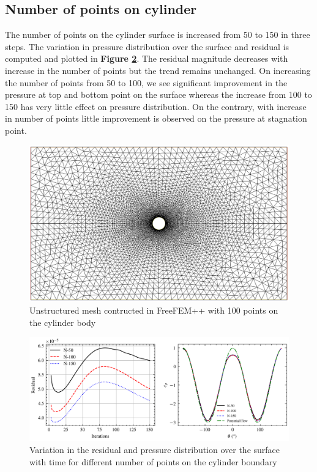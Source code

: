 \documentclass{article}
\begin{document}
\subsection{Number of points on cylinder}
The number of points on the cylinder surface is increased from 50 to 150 in three steps. The variation in
pressure distribution over the surface and residual is computed and plotted in \textbf{Figure \ref{fig:n}}.
The residual magnitude decreases with increase in the number of points but the trend remains unchanged. On
increasing the number of points from 50 to 100, we see significant improvement in the pressure at top and
bottom point on the surface whereas the increase from 100 to 150 has very little effect on pressure distribution.
On the contrary, with increase in number of points little improvement is observed on the pressure at stagnation
point.
\begin{figure}[H]
    \centering
    \includegraphics[width=\textwidth]{mesh.png}
    \caption{Unstructured mesh contructed in FreeFEM++ with 100 points on the cylinder body}
    \label{fig:mesh}
\end{figure}
\begin{figure}[H]
    \centering
    \includegraphics[width=\textwidth]{../n.png}
    \caption{Variation in the residual and pressure distribution over the surface with time for different number of points on the cylinder boundary}
    \label{fig:n}
\end{figure}
\end{document}
